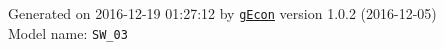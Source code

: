 \documentclass[10pt,a4paper]{article}
\numberwithin{equation}{section}
\begin{document}
\begin{landscape}
\begin{flushleft}{\large
Generated  on 2016-12-19 01:27:12 by \href{http://gecon.r-forge.r-project.org/}{\texttt{gEcon}} version 1.0.2 (2016-12-05)\\
Model name: \verb+SW_03+
}\end{flushleft}


\end{landscape}

\end{document}
